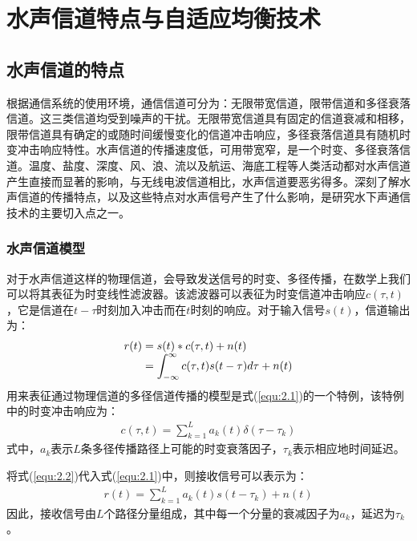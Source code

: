%
\chapter{水声信道特点与自适应均衡技术}
\thispagestyle{empty}
\section{水声信道的特点}
根据通信系统的使用环境，通信信道可分为：无限带宽信道，限带信道和多径衰落信道\citep{ProakisB2001}。这三类信道均受到噪声的干扰。无限带宽信道具有固定的信道衰减和相移，限带信道具有确定的或随时间缓慢变化的信道冲击响应，多径衰落信道具有随机时变冲击响应特性。水声信道的传播速度低，可用带宽窄，是一个时变、多径衰落信道。温度、盐度、深度、风、浪、流以及航运、海底工程等人类活动都对水声信道产生直接而显著的影响，与无线电波信道相比，水声信道要恶劣得多。深刻了解水声信道的传播特点，以及这些特点对水声信号产生了什么影响，是研究水下声通信技术的主要切入点之一。
\subsection{水声信道模型}
对于水声信道这样的物理信道，会导致发送信号的时变、多径传播，在数学上我们可以将其表征为时变线性滤波器。该滤波器可以表征为时变信道冲击响应$c(\tau,t)$，它是信道在$t-\tau$时刻加入冲击而在$t$时刻的响应。对于输入信号$s(t)$，信道输出为：
\begin{eqnarray}
    \begin{array}{l@{\;=\;}l}
        r(t)&s(t)*c(\tau,t)+n(t)\\
        &\displaystyle\int_{-\infty}^{\infty}c(\tau,t)s(t-\tau)d\tau+n(t)\\
    \end{array}
    \label{equ:2.1}
\end{eqnarray}
用来表征通过物理信道的多径信道传播的模型是式(\ref{equ:2.1})的一个特例，该特例中的时变冲击响应为：
\begin{eqnarray}
    c(\tau,t)=\sum_{k=1}^La_k(t)\delta(\tau-\tau_k)
    \label{equ:2.2}
\end{eqnarray}
式中，$a_k$表示$L$条多径传播路径上可能的时变衰落因子，$\tau_k$表示相应地时间延迟。

将式(\ref{equ:2.2})代入式(\ref{equ:2.1})中，则接收信号可以表示为：
\begin{eqnarray}
    r(t)=\sum_{k=1}^La_k(t)s(t-\tau_k)+n(t)
    \label{equ:2.3}
\end{eqnarray}
因此，接收信号由$L$个路径分量组成，其中每一个分量的衰减因子为$a_k$，延迟为$\tau_k$。

